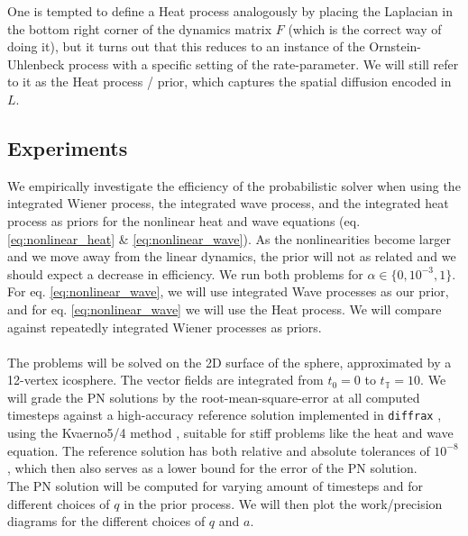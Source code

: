 \noindent
One is tempted to define a Heat process analogously by placing the Laplacian in the bottom right corner of the dynamics matrix $F$ (which is the correct way of doing it), but it turns out that this reduces to an instance of the Ornstein-Uhlenbeck process with a specific setting of the rate-parameter. We will still refer to it as the Heat process / prior, which captures the spatial diffusion encoded in $L$.

\subsection*{Experiments}
We empirically investigate the efficiency of the probabilistic solver when using the integrated Wiener process, the integrated wave process, and the integrated heat process as priors for the nonlinear heat and wave equations (eq. \ref{eq:nonlinear_heat} \& \ref{eq:nonlinear_wave}).
As the nonlinearities become larger and we move away from the linear dynamics, the prior will not as related and we should expect a decrease in efficiency.  We run both problems for $\alpha\in\{0, 10^{-3}, 1\}$.
\\ For eq. \ref{eq:nonlinear_wave}, we will use integrated Wave processes as our prior, and for eq. \ref{eq:nonlinear_wave} we will use the Heat process. We will compare against repeatedly integrated Wiener processes as priors.
\\\\
The problems will be solved on the 2D surface of the sphere, approximated by a 12-vertex icosphere. The vector fields are integrated from $t_0=0$ to $t_{\mathbb{T}}=10$.  We will grade the PN solutions by the root-mean-square-error at all computed timesteps against a high-accuracy reference solution implemented in \texttt{diffrax} \cite{diffrax}, using the Kvaerno5/4 method \cite{kvaerno}, suitable for stiff problems like the heat and wave equation. The reference solution has both relative and absolute tolerances of $10^{-8}$, which then also serves as a lower bound for the error of the PN solution.
\\ The PN solution will be computed for varying amount of timesteps and for different choices of $q$ in the prior process. We will then plot the work/precision diagrams for the different choices of $q$ and $a$.
